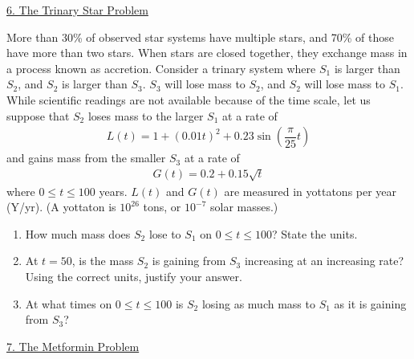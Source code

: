 \begin{center}
    \underline{6. The Trinary Star Problem}
\end{center}

More than 30\% of observed star systems have multiple stars, and 70\% of those have more than two stars. When stars are closed together, they exchange mass in a process known as accretion. Consider a trinary system where $S_1$ is larger than $S_2$, and $S_2$ is larger than $S_3$. $S_3$ will lose mass to $S_2$, and $S_2$ will lose mass to $S_1$. While scientific readings are not available because of the time scale, let us suppose that $S_2$ loses mass to the larger $S_1$ at a rate of \begin{align*}
    L(t) = 1 + (0.01t)^2 + 0.23\sin \left(\dfrac{\pi}{25}t\right)
\end{align*}
and gains mass from the smaller $S_3$ at a rate of \begin{align*}
    G(t) = 0.2 + 0.15\sqrt{t}
\end{align*}
where $0 \leq t \leq 100$ years. $L(t)$ and $G(t)$ are measured in yottatons per year (Y/yr). (A yottaton is $10^{26}$ tons, or $10^{-7}$ solar masses.) \\
\begin{enumerate}[label=\hspace{11pt}(\alph*), align=left, leftmargin=*, labelsep=0.25em]
    \item How much mass does $S_2$ lose to $S_1$ on $0 \leq t \leq 100$? State the units.
    \item At $t = 50$, is the mass $S_2$ is gaining from $S_3$ increasing at an increasing rate? Using the correct units, justify your answer.
    \item At what times on $0 \leq t \leq 100$ is $S_2$ losing as much mass to $S_1$ as it is gaining from $S_3$?
\end{enumerate} \vspace{11pt}

\begin{center}
    \underline{7. The Metformin Problem}
\end{center}

